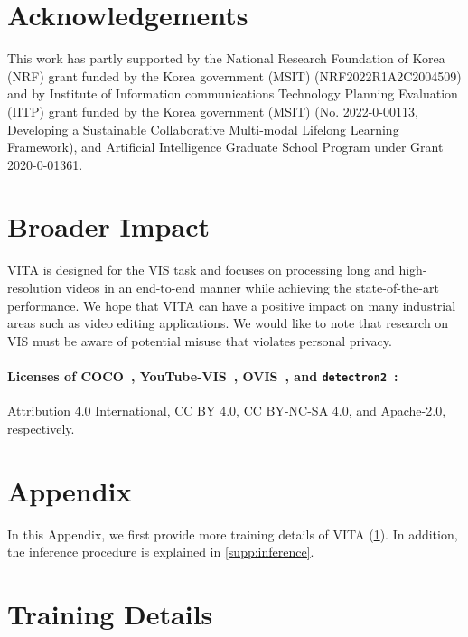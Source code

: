 \documentclass{article}
\begin{document}
\section*{Acknowledgements}
\label{sec:acknowledgements}
This work has partly supported by the National Research Foundation of Korea (NRF) grant funded by the Korea government (MSIT) (NRF2022R1A2C2004509) and by Institute of Information communications Technology Planning Evaluation (IITP) grant funded by the Korea government (MSIT) (No. 2022-0-00113, Developing a Sustainable Collaborative Multi-modal Lifelong Learning Framework), and Artificial Intelligence Graduate School Program under Grant 2020-0-01361.

\section*{Broader Impact}
\label{sec:broader impact}
VITA is designed for the VIS task and focuses on processing long and high-resolution videos in an end-to-end manner while achieving the state-of-the-art performance.
We hope that VITA can have a positive impact on many industrial areas such as video editing applications.
We would like to note that research on VIS must be aware of potential misuse that violates personal privacy.
\paragraph{Licenses of COCO~\cite{COCO}, YouTube-VIS~\cite{MaskTrackRCNN}, OVIS~\cite{OVIS-Dataset}, and  \texttt{detectron2}~\cite{Detectron2}:} Attribution 4.0 International, CC BY 4.0, CC BY-NC-SA 4.0, and Apache-2.0, respectively. 
 \clearpage

















\newpage
\appendix
\section*{Appendix}
In this Appendix, we first provide more training details of VITA (\cref{supp:training}). 
In addition, the inference procedure is explained in \cref{supp:inference}.


\section{Training Details}
\label{supp:training}
\end{document}
